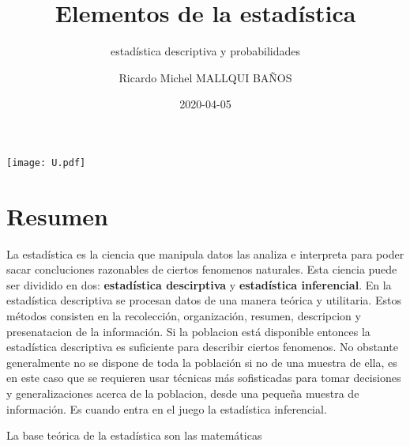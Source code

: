 \documentclass[10pt,]{krantz}
\title{Elementos de la estadística}
\subtitle{estadística descriptiva y probabilidades}
\author{Ricardo Michel MALLQUI BAÑOS}
\date{2020-04-05}
\let\oldincludegraphics\includegraphics
\renewcommand\includegraphics[2][]{%
  \oldincludegraphics[scale=0.85]{#2}
}
\theoremstyle{definition}
\theoremstyle{definition}
\theoremstyle{definition}
\theoremstyle{remark}
\begin{document}
\maketitle

\thispagestyle{empty}
\begin{center}
\texttt{[image: U.pdf]}
\end{center}


{
\hypersetup{linkcolor=}
\setcounter{tocdepth}{2}
\tableofcontents
}
\listoftables
\listoffigures
\newcommand{\N}{\mathbb{N}}
\newcommand{\R}{\mathbb{R}}
\newcommand{\CC}{\mathbb{C}}
\newcommand{\I}{\mathbb{I}}
\newcommand{\f}{\mathbb{f}}
\newcommand{\X}{\mathbb{X}}
\newcommand{\D}{\mathbb{D}}
\newcommand{\Z}{\mathbb{Z}}
\newcommand{\Q}{\mathbb{Q}}
\newcommand{\norm}[1]{\left\Vert#1\right\Vert}
\newcommand{\abs}[1]{\left\vert#1\right\vert}
\newcommand{\set}[1]{\left\{#1\right\}}
\newcommand{\seq}[1]{\left<#1\right>}
\newcommand{\co}[1]{\left[#1\right]}
\newcommand{\cc}[1]{\left(#1\right)}
\newcommand{\J}{\mathcal{J}}
\newcommand{\K}{\mathcal{K}}
\newcommand{\M}{\mathcal{M}}
\newcommand{\F}{\mathcal{F}}

\hypertarget{resumen}{%
\chapter*{Resumen}\label{resumen}}


La estadística es la ciencia que manipula datos las analiza e interpreta para poder sacar concluciones razonables de ciertos fenomenos naturales. Esta ciencia puede ser dividido en dos: \textbf{estadística descirptiva} y \textbf{estadística inferencial}. En la estadística descriptiva se procesan datos de una manera teórica y utilitaria. Estos métodos consisten en la recolección, organización, resumen, descripcion y presenatacion de la información. Si la poblacion está disponible entonces la estadística descriptiva es suficiente para describir ciertos fenomenos. No obstante generalmente no se dispone de toda la población si no de una muestra de ella, es en este caso que se requieren usar técnicas más sofisticadas para tomar decisiones y generalizaciones acerca de la poblacion, desde una pequeña muestra de información. Es cuando entra en el juego la estadística inferencial.

La base teórica de la estadística son las matemáticas
\end{document}
